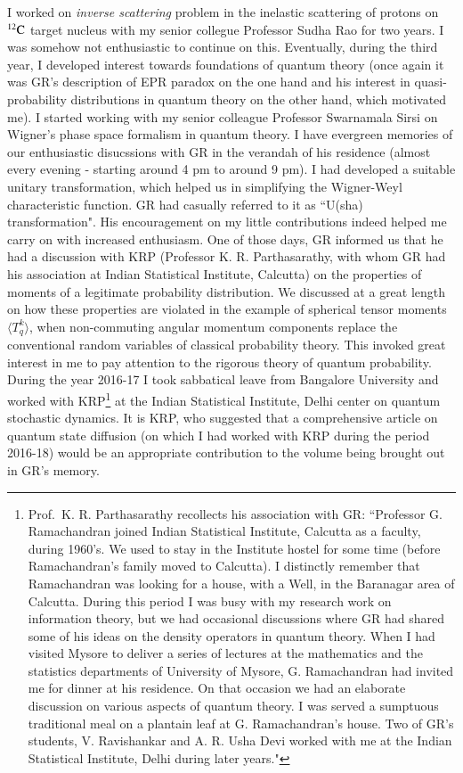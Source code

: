 I worked on \textit{inverse scattering} problem in the inelastic scattering of protons on $^{12}{\rm C}$ target nucleus with my senior collegue Professor Sudha Rao for two years. I was somehow not enthusiastic to continue on this. Eventually, during the third year, I developed interest towards foundations of quantum theory (once again it was GR's description of EPR paradox on the one hand and his interest in quasi-probability distributions in quantum theory on the other hand, which motivated me). I started working with my senior colleague Professor Swarnamala Sirsi on Wigner’s phase space formalism in quantum theory. I have evergreen memories of our enthusiastic disucssions with GR in the verandah of his residence (almost every evening - starting around 4 pm to around 9 pm). I had developed a suitable unitary transformation, which helped us in simplifying the Wigner-Weyl characteristic function. GR had casually referred to it as ``U(sha) transformation". His encouragement on my little contributions indeed helped me carry on with increased enthusiasm. One of those days, GR informed us that he had a discussion with KRP (Professor K. R. Parthasarathy, with whom GR had his association at Indian Statistical Institute, Calcutta) on the properties of moments of a legitimate probability distribution. We discussed at a great length on how these properties are violated in the example of spherical tensor moments $\langle T_{q}^{k} \rangle$, when non-commuting angular momentum components replace the conventional random variables of classical probability theory. This invoked great interest in me to pay attention to the rigorous theory of quantum probability. During the year 2016-17 I took sabbatical leave from Bangalore University and worked with KRP\footnote{Prof.\ K. R. Parthasarathy recollects his association with GR: ``Professor G. Ramachandran joined Indian Statistical Institute, Calcutta as a faculty, during 1960's. We used to stay in the Institute hostel for some time (before Ramachandran's family moved to Calcutta). I distinctly remember that Ramachandran was looking for a house, with a Well, in the Baranagar area of Calcutta. During this period I was busy with my research work on information theory, but we had occasional discussions where GR had shared some of his ideas on the density operators in quantum theory. When I had visited Mysore to deliver a series of lectures at the mathematics and the statistics departments of University of Mysore, G. Ramachandran had invited me for dinner at his residence. On that occasion we had an elaborate discussion on various aspects of quantum theory. I was served a sumptuous traditional meal on a plantain leaf at G. Ramachandran's house. Two of GR’s students, V. Ravishankar and A. R. Usha Devi worked with me at the Indian Statistical Institute, Delhi during later years."} at the Indian Statistical Institute, Delhi center on quantum stochastic dynamics. It is KRP, who suggested that a comprehensive article on quantum state diffusion (on which I had worked with KRP during the period 2016-18) would be an appropriate contribution to the volume being brought out in GR’s memory.

